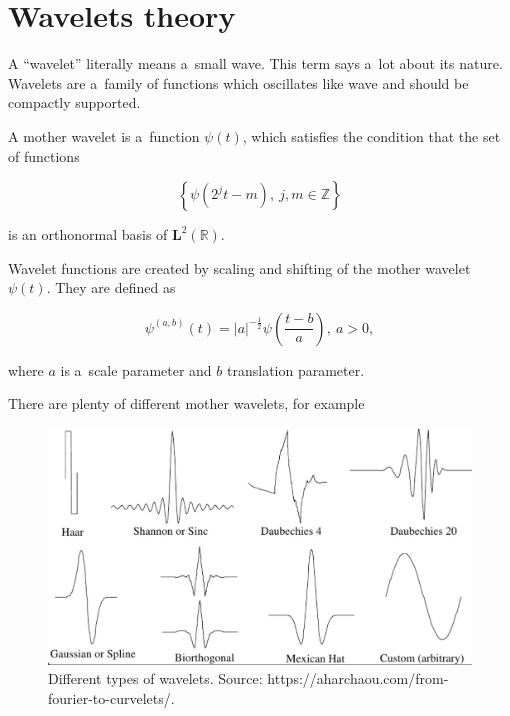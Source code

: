 \chapter{Wavelets theory}
\label{ch:theory}
A ``wavelet'' literally means a~small wave. This term says a~lot about its nature. Wavelets are a~family of functions which oscillates like wave and should be compactly supported.

\begin{defn}
A mother wavelet is a~function $\psi(t)$, which satisfies the condition that the set of functions

\begin{equation}
\left\{\psi(2^j t-m),\ j,m\in\mathbb{Z}\right\}
\end{equation}

is an orthonormal basis of $\mathbf{L}^2(\mathbb{R})$.
\end{defn}

\begin{defn}
Wavelet functions are created by scaling and shifting of the mother wavelet $\psi(t)$. They are defined as

\begin{equation}
\label{eq:wavelets}
\psi^{(a,b)}(t)=|a|^{-\frac{1}{2}} \psi\left(\frac{t-b}{a}\right),\ a>0,
\end{equation}

where $a$ is a~scale parameter and $b$ translation parameter.
\end{defn}

There are plenty of different mother wavelets, for example

\begin{figure}[h]
	\centering
	\includegraphics[width=\textwidth]{wavelets_with_bottom_line.png}
	\caption{Different types of wavelets. \newline
		Source: https://aharchaou.com/from-fourier-to-curvelets/.}
	\label{fig:wavelets}
\end{figure}

